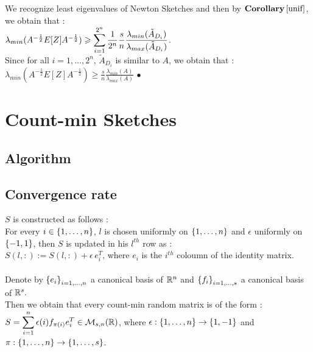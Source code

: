 We recognize least eigenvalues of Newton Sketches and then by $\textbf{Corollary}\, \ref{unif}$, we obtain that :\\

$\lambda_{min}(A^{-\frac12}E[Z]A^{-\frac12}) \geqslant  \displaystyle\sum\limits_{i=1}^{2^{n}} \frac{1}{ 2^{n}} \frac{s}{n} \frac{\lambda_{min}(\tilde{A}_{D_{i}})}{\lambda_{max}(\tilde{A}_{D_{i}})}$.\\
Since for all $i = 1,\dots, 2^{n}$, $\tilde{A}_{D_{i}}$ is similar to $A$, we obtain that :\\

$\lambda_{min}(A^{-\frac12}E[Z]A^{-\frac12}) \geq \frac{s}{n} \frac{\lambda_{min}(A)}{\lambda_{max}(A)}$ $\bullet$




\chapter{Count-min Sketches}

%
%
%

\section{Algorithm}


\section{Convergence rate}

$S$ is constructed as follows :\\
For every $i\in\left\{1,\dots,n\right\}$, $l$ is chosen uniformly on $\left\{1,\dots,n\right\}$ and $\epsilon$ uniformly on $\left\{-1,1\right\}$, then $S$ is updated in his $l^{th}$ row as :\\
$S(l, :) := S(l,:) + \epsilon \, e_{i}^{T}$, where $e_{i}$ is the $i^{th}$ coloumn of the identity matrix.\\\\

Denote by $\left\{e_{i}\right\}_{i=1,\dots,n}$ a canonical basis of ${\mathbb R}^{n}$  and $\left\{f_{i}\right\}_{i=1,\dots,s}$ a canonical basis of ${\mathbb R}^{s}.$\\ 
Then we obtain that every count-min random matrix is of the form : \\
$\displaystyle S = \displaystyle\sum_{i=1}^{n} \displaystyle\epsilon(i) f_{\pi(i)}e_{i}^{T} \in {\mathcal M}_{s,n}({\mathbb R})$, where $\epsilon : \left\{1,\dots,n\right\} \rightarrow \left\{1,-1\right\}$ and $\pi : \left\{1,\dots,n\right\} \rightarrow \left\{1,\dots,s\right\} $.\\

